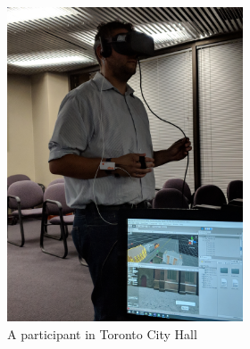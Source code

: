 \begin{figure}[!ht]
\begin{adjustbox}{varwidth=\textwidth,fbox,center}
\centering
\begin{subfigure}{0.8\linewidth}

    \begin{subfigure}[b]{0.5\textwidth}
         \centering
         \includegraphics[trim=100 100 100 175,clip,
         scale=0.06]{chapter_4/figures/participant.jpg}
         \caption{A participant in Toronto City Hall}
     \end{subfigure}
     \hfill
     \begin{subfigure}[b]{0.5\textwidth}
         \centering

\end{subfigure}
\end{subfigure}
\end{adjustbox}
\end{figure}
